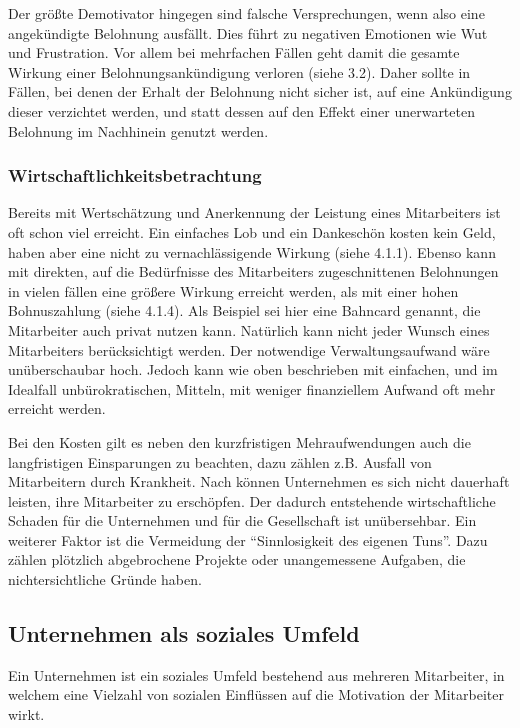 Der größte Demotivator hingegen sind falsche Versprechungen, wenn also eine angekündigte Belohnung ausfällt. Dies führt zu negativen Emotionen wie Wut und Frustration. Vor allem bei mehrfachen Fällen geht damit die gesamte Wirkung einer Belohnungsankündigung verloren (siehe 3.2). Daher sollte in Fällen, bei denen der Erhalt der Belohnung nicht sicher ist, auf eine Ankündigung dieser verzichtet werden, und statt dessen auf den Effekt einer unerwarteten Belohnung im Nachhinein genutzt werden. 

\subsubsection{Wirtschaftlichkeitsbetrachtung}
Bereits mit Wertschätzung und Anerkennung der Leistung eines Mitarbeiters ist oft schon viel erreicht. Ein einfaches Lob und ein Dankeschön kosten kein Geld, haben aber eine nicht zu vernachlässigende Wirkung (siehe 4.1.1). Ebenso kann mit direkten, auf die Bedürfnisse des Mitarbeiters zugeschnittenen Belohnungen in vielen fällen eine größere Wirkung erreicht werden, als mit einer hohen Bohnuszahlung (siehe 4.1.4). Als Beispiel sei hier eine Bahncard genannt, die Mitarbeiter auch privat nutzen kann. 
Natürlich kann nicht jeder Wunsch eines Mitarbeiters berücksichtigt werden. Der notwendige Verwaltungsaufwand wäre unüberschaubar hoch. Jedoch kann wie oben beschrieben mit einfachen, und im Idealfall unbürokratischen, Mitteln, mit weniger finanziellem Aufwand oft mehr erreicht werden. 

Bei den Kosten gilt es neben den kurzfristigen Mehraufwendungen auch die langfristigen Einsparungen zu beachten, dazu zählen z.B. Ausfall von Mitarbeitern durch Krankheit. Nach \citet{Schlolaut.2013} können Unternehmen es sich nicht dauerhaft leisten, ihre Mitarbeiter zu erschöpfen. Der dadurch entstehende wirtschaftliche Schaden für die Unternehmen und für die Gesellschaft ist unübersehbar. Ein weiterer Faktor ist die Vermeidung der “Sinnlosigkeit des eigenen Tuns”. Dazu zählen plötzlich abgebrochene Projekte oder unangemessene Aufgaben, die nichtersichtliche Gründe haben.

\subsection{Unternehmen als soziales Umfeld}
Ein Unternehmen ist ein soziales Umfeld bestehend aus mehreren Mitarbeiter, in welchem eine Vielzahl von sozialen Einflüssen auf die Motivation der Mitarbeiter wirkt. 

